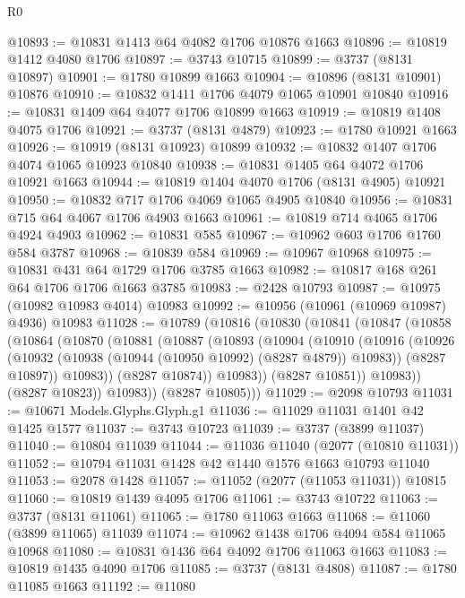 \begin{lexlean}{R0}
\begin{coremodule}
@10893 := @10831 @1413 @64 @4082 @1706 @10876 @1663
@10896 := @10819 @1412 @4080 @1706
@10897 := @3743 @10715
@10899 := @3737 (@8131 @10897)
@10901 := @1780 @10899 @1663
@10904 := @10896 (@8131 @10901) @10876
@10910 := @10832 @1411 @1706 @4079 @1065 @10901 @10840
@10916 := @10831 @1409 @64 @4077 @1706 @10899 @1663
@10919 := @10819 @1408 @4075 @1706
@10921 := @3737 (@8131 @4879)
@10923 := @1780 @10921 @1663
@10926 := @10919 (@8131 @10923) @10899
@10932 := @10832 @1407 @1706 @4074 @1065 @10923 @10840
@10938 := @10831 @1405 @64 @4072 @1706 @10921 @1663
@10944 := @10819 @1404 @4070 @1706 (@8131 @4905) @10921
@10950 := @10832 @717 @1706 @4069 @1065 @4905 @10840
@10956 := @10831 @715 @64 @4067 @1706 @4903 @1663
@10961 := @10819 @714 @4065 @1706 @4924 @4903
@10962 := @10831 @585
@10967 := @10962 @603 @1706 @1760 @584 @3787
@10968 := @10839 @584
@10969 := @10967 @10968
@10975 := @10831 @431 @64 @1729 @1706 @3785 @1663
@10982 := @10817 @168 @261 @64 @1706 @1706 @1663 @3785
@10983 := @2428 @10793
@10987 := @10975 (@10982 @10983 @4014) @10983
@10992 := @10956 (@10961 (@10969 @10987) @4936) @10983
@11028 := @10789
    (@10816
      (@10830
        (@10841
          (@10847
            (@10858
              (@10864
                (@10870
                  (@10881
                    (@10887
                      (@10893
                        (@10904
                          (@10910
                            (@10916
                              (@10926
                                (@10932 (@10938 (@10944 (@10950 @10992) (@8287 @4879)) @10983))
                                (@8287 @10897))
                              @10983))
                          (@8287 @10874))
                        @10983))
                    (@8287 @10851))
                  @10983))
              (@8287 @10823))
            @10983))
        (@8287 @10805)))
@11029 := @2098 @10793
@11031 := @10671 Models.Glyphs.Glyph.g1
@11036 := @11029 @11031 @1401 @42 @1425 @1577
@11037 := @3743 @10723
@11039 := @3737 (@3899 @11037)
@11040 := @10804 @11039
@11044 := @11036 @11040 (@2077 (@10810 @11031))
@11052 := @10794 @11031 @1428 @42 @1440 @1576 @1663 @10793 @11040
@11053 := @2078 @1428
@11057 := @11052 (@2077 (@11053 @11031)) @10815
@11060 := @10819 @1439 @4095 @1706
@11061 := @3743 @10722
@11063 := @3737 (@8131 @11061)
@11065 := @1780 @11063 @1663
@11068 := @11060 (@3899 @11065) @11039
@11074 := @10962 @1438 @1706 @4094 @584 @11065 @10968
@11080 := @10831 @1436 @64 @4092 @1706 @11063 @1663
@11083 := @10819 @1435 @4090 @1706
@11085 := @3737 (@8131 @4808)
@11087 := @1780 @11085 @1663
@11192 := @11080

\end{coremodule}
\end{lexlean}
